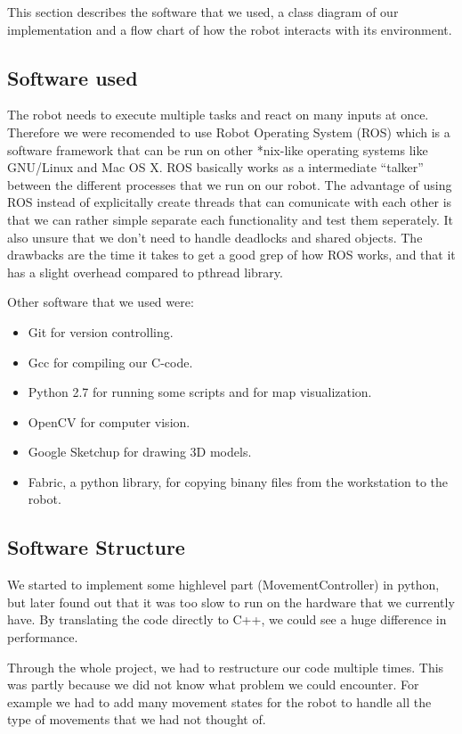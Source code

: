 This section describes the software that we used, a class diagram of our implementation and a flow chart of how the robot interacts with its environment.

\subsection{Software used}
The robot needs to execute multiple tasks and react on many inputs at once. Therefore we were recomended to use Robot Operating System (ROS) which is a software framework that can be run on other *nix-like operating systems like GNU/Linux and Mac OS X. ROS basically works as a intermediate ``talker'' between the different processes that we run on our robot. The advantage of using ROS instead of explicitally create threads that can comunicate with each other is that we can rather simple separate each functionality and test them seperately. It also unsure that we don't need to handle deadlocks and shared objects. The drawbacks are the time it takes to get a good grep of how ROS works, and that it has a slight overhead compared to pthread library.

Other software that we used were:
\begin{itemize}
\item Git for version controlling.
\item Gcc for compiling our C-code.
\item Python 2.7 for running some scripts and for map visualization.
\item OpenCV for computer vision.
\item Google Sketchup for drawing 3D models.
\item Fabric, a python library, for copying binany files from the workstation to the robot.
\end{itemize}

\subsection{Software Structure}
We started to implement some highlevel part (MovementController) in python, but later found out that it was too slow to run on the hardware that we currently have. By translating the code directly to C++, we could see a huge difference in performance.

Through the whole project, we had to restructure our code multiple times. This was partly because we did not know what problem we could encounter. For example we had to add many movement states for the robot to handle all the type of movements that we had not thought of.

